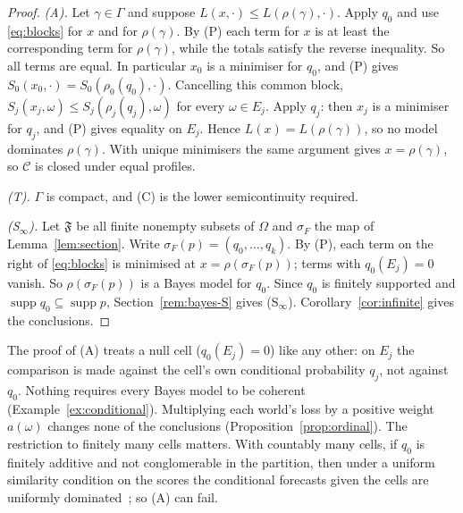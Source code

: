 \documentclass[11pt]{article}
\theoremstyle{definition}
\theoremstyle{remark}
\newcommand{\C}{\mathcal C}
\newcommand{\F}{\mathfrak F}
\newcommand{\supp}{\operatorname{supp}}
\begin{document}
\begin{proof}
\emph{(A).} Let $\gamma\in\Gamma$ and suppose $L(x,\cdot)\le L(\rho(\gamma),\cdot)$. Apply $q_0$ and use \eqref{eq:blocks} for $x$ and for $\rho(\gamma)$. By (P) each term for $x$ is at least the corresponding term for $\rho(\gamma)$, while the totals satisfy the reverse inequality. So all terms are equal. In particular $x_0$ is a minimiser for $q_0$, and (P) gives $S_0(x_0,\cdot)=S_0(\rho_0(q_0),\cdot)$. Cancelling this common block, $S_j(x_j,\omega)\le S_j(\rho_j(q_j),\omega)$ for every $\omega\in E_j$. Apply $q_j$: then $x_j$ is a minimiser for $q_j$, and (P) gives equality on $E_j$. Hence $L(x)=L(\rho(\gamma))$, so no model dominates $\rho(\gamma)$. With unique minimisers the same argument gives $x=\rho(\gamma)$, so $\C$ is closed under equal profiles.

\emph{(T).} $\Gamma$ is compact, and (C) is the lower semicontinuity required.

\emph{(S$_\infty$).} Let $\F$ be all finite nonempty subsets of $\Omega$ and $\sigma_F$ the map of Lemma~\ref{lem:section}. Write $\sigma_F(p)=(q_0,\dots,q_k)$. By (P), each term on the right of \eqref{eq:blocks} is minimised at $x=\rho(\sigma_F(p))$; terms with $q_0(E_j)=0$ vanish. So $\rho(\sigma_F(p))$ is a Bayes model for $q_0$. Since $q_0$ is finitely supported and $\supp q_0\subseteq\supp p$, Section~\ref{rem:bayes-S} gives (S$_\infty$). Corollary~\ref{cor:infinite} gives the conclusions.
\end{proof}
The proof of (A) treats a null cell ($q_0(E_j)=0$) like any other: on $E_j$ the comparison is made against the cell's own conditional probability $q_j$, not against $q_0$. Nothing requires every Bayes model to be coherent (Example~\ref{ex:conditional}). Multiplying each world's loss by a positive weight $a(\omega)$ changes none of the conclusions (Proposition~\ref{prop:ordinal}). The restriction to finitely many cells matters. With countably many cells, if $q_0$ is finitely additive and not conglomerable in the partition, then under a uniform similarity condition on the scores the conditional forecasts given the cells are uniformly dominated~\cite[Theorem~2]{SSK14}; so (A) can fail.
\end{document}
